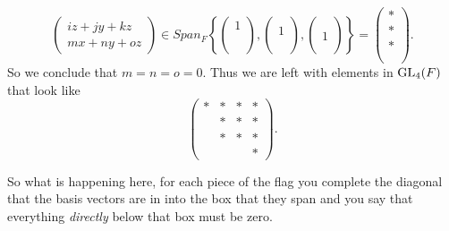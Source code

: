 \begin{example}
\[\begin{pmatrix}
            iz+jy+kz\\
            mx+ny+oz
        \end{pmatrix} \in Span_F\left\{\begin{pmatrix}
            1 \\
            \\
            \\
            \\
        \end{pmatrix}, \begin{pmatrix}
             \\
            1\\
            \\
            \\
        \end{pmatrix}, \begin{pmatrix}
             \\
            \\
            1\\
            \\
        \end{pmatrix}\right\} =\begin{pmatrix}
            *\\
            *\\
            *\\
            \\
        \end{pmatrix}. \]
        So we conclude that \(m = n = o = 0\). Thus we are left with elements in \(\operatorname{GL}_4(F)\) that look like
        \[\begin{pmatrix}
            * & *&*&*\\
            & *&*&*\\
            &*&*&*\\
            &&&*
        \end{pmatrix}.\]

    \end{example}


    So what is happening here, for each piece of the flag you complete the diagonal that the basis vectors are in into the box that they span and you say that everything \textit{directly} below that box must be zero. 
    




